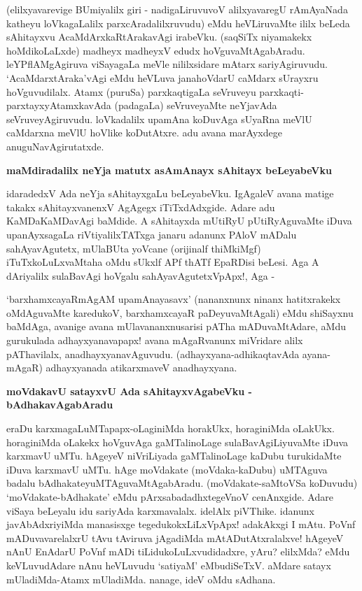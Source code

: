 \noindent
(elilxyavarevige BUmiyalilx giri - nadigaLiruvuvoV alilxyavaregU rAmA\-yaNada katheyu loVkagaLalilx parxcAradalilxruvudu) eMdu heVLiruvaMte ililx beLeda sAhitayxvu AcaMdArxkaRtArakavAgi ira\-beVku. (saqSiTx niyamakekx hoMdikoLaLxde) madheyx madheyxV edudx hoVguvaMtAgabAradu. leYPflAMgA\-giruva viSayagaLa meVle nililxsidare mAtarx sariyAgiruvudu. `AcaMdarxtAraka'vAgi eMdu heVLuva jana\-hoVdarU caMdarx sUrayxru hoVguvudilalx. Atamx (puruSa) parxkaqtigaLa seVruveyu parxkaqti-parxtayxyA\-tamxkavAda (padagaLa) seVruveyaMte neYjavAda seVruveyAgiru\break\-vudu. loVkadalilx upamAna koDuvAga sUyaRna meVlU caMdarxna meVlU hoVlike koDutAtxre. adu avana marAyxdege anuguNavAgiru\-tatxde.

\newpage

{\bigskip
\noindent
{\large\bf maMdiradalilx neYja matutx asAmAnayx sAhitayx beLeyabeVku}}
\medskip

\noindent
idaradedxV Ada neYja sAhitayxgaLu beLeyabeVku. IgAgaleV avana matige takakx sAhitayxvanenxV AgAgegx iTiTx\-dAdxgide. Adare adu KaMDaKaMDavAgi baMdide. A sAhitayxda mUtiRyU pUtiRyAguvaMte iDuva upa\-nAyxsagaLa riVtiyalilxTATxga janaru adanunx PAloV mADalu sahAyavAgutetx, mUlaBUta yoV\-cane (orijinalf thiMkiMgf) iTuTxkoLuLxvaMtaha oMdu sUkxlf APf thATf EpaRDisi beLesi. Aga A dAriyalilx sulaBavAgi hoVgalu sahAyavAgutetxVpApx!, Aga - 

`barxhamxcayaRmAgAM\label{78} upamAnayasavx' (nananxnunx ninanx hatitxrakekx oMdAguvaMte karedukoV, barxhamx\-cayaR paDeyuvaMtAgali) eMdu shiSayxnu baMdAga, avanige avana mUlavananxnusarisi pATha mADu\-vaMtAdare, aMdu gurukulada adhayxyana\-vapapx! avana mAgaRvanunx miVridare alilx pAThavilalx, anadhayx\-yanavAguvudu. (adhayxyana-adhikaqtavAda ayana-mAgaR) adhayxyanada atikarxmaveV anadhayxyana.

{\bigskip
\noindent
{\large\bf moVdakavU satayxvU Ada sAhitayxvAgabeVku - bAdhakavAgabAradu}}\label{page78}
\medskip

\noindent
eraDu karxmagaLuMTapapx-oLaginiMda horakUkx, horaginiMda oLakUkx. horaginiMda oLakekx hoVgu\-vAga gaMTalinoLage sulaBavAgiLiyuvaMte iDuva karxmavU uMTu. hAgeyeV niVriLiyada gaMTali\-noLage kaDubu turukidaMte iDuva karxmavU uMTu. hAge moVdakate (moVdaka-kaDubu) uMTA\-guva badalu bAdhakateyuMTAguvaMtAgabAradu. (moVdakate-saMtoVSa koDuvudu) `moVdakate\--bAdha\-kate' eMdu pArxsabadadhxtegeVnoV cenAnxgide. Adare viSaya beLeyalu idu sariyAda karxmavalalx. idelAlx piVThike. idanunx javAbAdxriyiMda manasisxge tegedukokxLiLxVpApx! adakAkxgi I mAtu. PoVnf mADuva\-varelalxrU tAvu tAviruva jAgadiMda mAtADutAtxralalxve! hAgeyeV nAnU EnAdarU PoVnf mADi tiLidukoLuLxvudidadxre, yAru? elilxMda? eMdu keVLuvudAdare nAnu heVLuvudu `satiyaM' eMbu\-diSeTxV. aMdare satayx mUladiMda-Atamx mUladiMda. nanage, ideV oMdu sAdhana.

